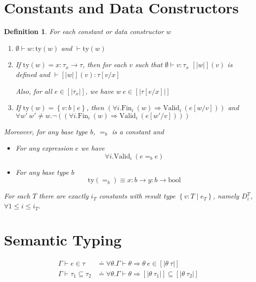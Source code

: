 \documentclass[10pt,a4paper]{article}
\newtheorem{definition}{Definition}
\newcommand\dcti{\dct{i}}
\newcommand\dct[1]{\ensuremath{D^T_{#1}}}
\newcommand\eapp[2]{\ensuremath{#1 \ #2}}
\newcommand\tbool{\ensuremath{\text{bool}}}
\newcommand\tref[3]{\ensuremath{\left\lbrace {#1} \colon {#2} \mid {#3} \right\rbrace}}
\newcommand\tfun[3]{\ensuremath{#1\colon #2 \rightarrow #3}}
\newcommand\eqb[1]{\ensuremath{=_{#1}}}
\newcommand\validi[1]{\ensuremath{\text{Valid}_{i}\ (#1)}}
\newcommand\fini[1]{\ensuremath{\text{Fin}_{i}\ (#1)}}
\newcommand\generalconditionInterp[2]
	{\ensuremath{(\forall i. \fini{#1} \Rightarrow \validi{#2})}}
\newcommand\generalconditionImplOne[1]
	{\ensuremath{\forall i . \validi{#1}}}
\newcommand\ty[1]{\ensuremath{\text{ty}({#1})}}
\newcommand\sub[2]{\ensuremath{\left[ #2 / #1 \right]}}
\newcommand\interp[1]{\ensuremath{[|#1|]}}
\newcommand\hastype[3]{\ensuremath{#1 \vdash #2 : #3}}
\newcommand\shastype[3]{\ensuremath{#1 \vdash #2 \in #3}}
\newcommand\iswellformed[2]{\ensuremath{#1 \vdash #2}}
\newcommand\sissubtype[3]{\ensuremath{#1 \vdash #2 \subseteq #3}}
\begin{document}
\section*{Constants and Data Constructors}
\begin{definition}\label{def:constants}
For each constant or data constructor $w$

\newcommand\const{\ensuremath{w}}
\begin{enumerate}
\item \hastype{\emptyset}{\const}{\ty{\const}} and \iswellformed{}{\ty{\const}}
\item If $\ty{\const} = \tfun{x}{\tau_x}{\tau}$, then for each $v$ such that
\hastype{\emptyset}{v}{\tau_x} $\interp{\const}(v)$ is defined and
\hastype{}{\interp{\const}(v)}{\tau\sub{x}{v}}

Also, for all $e\in\interp{\tau_x}$, we have $\eapp{\const}{e}\in\interp{\tau\sub{x}{e}}$

\item If $\ty{\const} = \tref{v}{b}{e}$, 
then \generalconditionInterp{\const}{e\sub{v}{\const}} and 
$\forall \const'\ \const' \neq \const. \lnot (\generalconditionInterp{\const}{e\sub{v}{\const'}})$ 
\end{enumerate}
Moreover, for any base type $b$, \eqb{b} is a constant and 
\begin{itemize}
\item For any expression $e$ we have 
$$\generalconditionImplOne{e \eqb{b} e}$$
\item For any base type $b$ 
$$\ty{=_b} \equiv \tfun{x}{b}{\tfun{y}{b}{\tbool}}$$
\end{itemize}

For each $T$ there are exactly $i_T$ constants with result type $\tref{v}{T}{e_T}$, 
namely   $\dcti$, $\forall 1 \leq i \leq i_T$.
\end{definition}

\section*{Semantic Typing}
\begin{align*}
\shastype{\Gamma}{e}{\tau} & \doteq
	\forall \theta . \iswellformed{\Gamma}{\theta} \Rightarrow \theta\ e \in \interp{\theta \ \tau}\\
\sissubtype{\Gamma}{\tau_1}{\tau_2} & \doteq 
	\forall \theta . \iswellformed{\Gamma}{\theta} \Rightarrow \interp{\theta\ \tau_1} \subseteq \interp{\theta\ \tau_2}
\end{align*}
\end{document}
